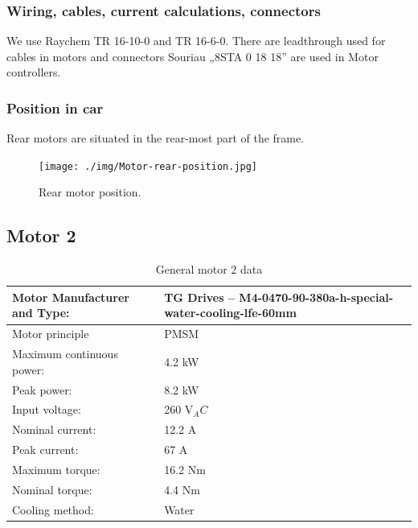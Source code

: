 \subsubsection{Wiring, cables, current calculations, connectors}
We use Raychem TR 16-10-0 and TR 16-6-0. There are leadthrough used for cables in motors and connectors Souriau „8STA 0 18 18” are used in Motor controllers.

\subsubsection{Position in car}

Rear motors are situated in the rear-most part of the frame. 

\begin{figure}[H]
	\centering
	\texttt{[image: ./img/Motor-rear-position.jpg]}
	\caption{Rear motor position.}
	\label{fig:Motor-rear-position}
\end{figure}

\subsection{Motor 2}%

\begin{table}[H]
	\centering
	\caption{General motor 2 data}
	\begin{tabularx}{\textwidth}{|X|X|}\hline
		Motor Manufacturer and Type: & TG Drives – M4-0470-90-380a-h-special-water-cooling-lfe-60mm \\[\TableSize]\hline
		Motor principle & PMSM \\[\TableSize]\hline
		Maximum continuous power: & 4.2 kW \\[\TableSize]\hline
		Peak power: & 8.2 kW \\[\TableSize]\hline
		Input voltage: & 260 V$_AC$ \\[\TableSize]\hline
		Nominal current: & 12.2 A \\[\TableSize]\hline
		Peak current: & 67 A \\[\TableSize]\hline
		Maximum torque: & 16.2 Nm \\[\TableSize]\hline
		Nominal torque: & 4.4 Nm \\[\TableSize]\hline
		Cooling method: & Water \\[\TableSize]\hline
	\end{tabularx}%
	\label{tab:motors2-general}%
\end{table}%


